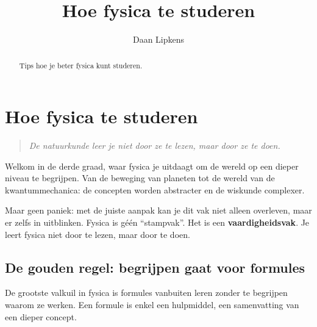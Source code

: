 \documentclass{ximera}
\title{Hoe fysica te studeren}
\author{Daan Lipkens}
\begin{document}
\begin{abstract}
    Tips hoe je beter fysica kunt studeren.
\end{abstract}
\maketitle


\section{Hoe fysica te studeren}
\begin{quote}
\textit{De natuurkunde leer je niet door ze te lezen, maar door ze te doen.}
\end{quote}

Welkom in de derde graad, waar fysica je uitdaagt om de wereld op een dieper niveau te begrijpen.  
Van de beweging van planeten tot de wereld van de kwantummechanica: de concepten worden abstracter en de wiskunde complexer.  

Maar geen paniek: met de juiste aanpak kan je dit vak niet alleen overleven, maar er zelfs in uitblinken.  
Fysica is géén “stampvak”. Het is een \textbf{vaardigheidsvak}.  
Je leert fysica niet door te lezen, maar door te doen.


\subsection{De gouden regel: begrijpen gaat voor formules}

\begin{fact}[] %
De grootste valkuil in fysica is formules vanbuiten leren zonder te begrijpen waarom ze werken.  
Een formule is enkel een hulpmiddel, een samenvatting van een dieper concept.
\end{fact}
\end{document}
